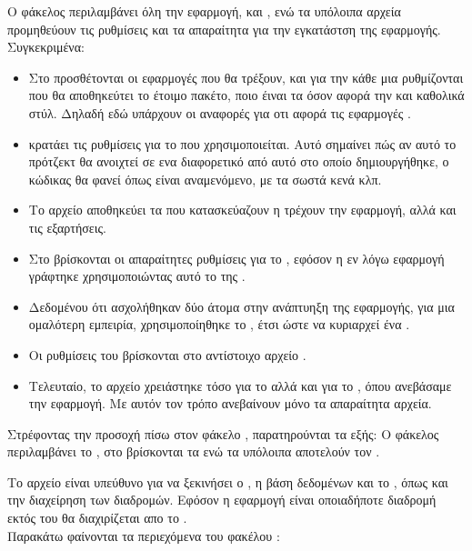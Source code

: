 \pSpace Ο φάκελος  περιλαμβάνει όλη την εφαρμογή,  και , ενώ τα υπόλοιπα αρχεία προμηθεύουν τις ρυθμίσεις και τα απαραίτητα για την εγκατάστση της εφαρμογής.\\
\pSpace Συγκεκριμένα:
\begin{itemize}
	\item Στο  προσθέτονται οι εφαρμογές που θα τρέξουν, και για την κάθε μια ρυθμίζονται που θα αποθηκεύτει το έτοιμο πακέτο, ποιο έιναι τα  όσον αφορά την  και καθολικά στύλ. Δηλαδή εδώ υπάρχουν οι αναφορές για οτι αφορά τις εφαρμογές .
	\item {} κρατάει τις ρυθμίσεις για το  που χρησιμοποιείται. Αυτό σημαίνει πώς αν αυτό το πρότζεκτ θα ανοιχτεί σε ενα διαφορετικό  από αυτό στο οποίο δημιουργήθηκε, ο κώδικας θα φανεί όπως είναι αναμενόμενο, με τα σωστά κενά κλπ.
	\item Το αρχείο  αποθηκεύει τα  που κατασκεύαζουν η τρέχουν την εφαρμογή, αλλά και τις εξαρτήσεις.
	\item Στο  βρίσκονται οι απαραίτητες ρυθμίσεις για το , εφόσον η εν λόγω εφαρμογή γράφτηκε χρησιμοποιώντας αυτό το  της .
	\item Δεδομένου ότι ασχολήθηκαν δύο άτομα στην ανάπτυηξη της εφαρμογής, για μια ομαλότερη εμπειρία, χρησιμοποίηθηκε το , έτσι ώστε να κυριαρχεί ένα . 
	\item Οι ρυθμίσεις του  βρίσκονται στο αντίστοιχο αρχείο .
	\item Τελευταίο, το αρχείο  χρειάστηκε τόσο για το  αλλά και για το , όπου ανεβάσαμε την εφαρμογή. Με αυτόν τον τρόπο ανεβαίνουν μόνο τα απαραίτητα αρχεία.
\end{itemize}
\pSpace Στρέφοντας την προσοχή πίσω στον φάκελο , παρατηρούνται τα εξής:
\pSpace Ο φάκελος  περιλαμβάνει το , στο  βρίσκονται τα  ενώ τα υπόλοιπα αποτελούν τον .

\pSpace Το αρχείο  είναι υπεύθυνο για να ξεκινήσει ο , η βάση δεδομένων και το , όπως και την διαχείρηση των διαδρομών. Εφόσον η εφαρμογή είναι  οποιαδήποτε διαδρομή εκτός του  θα διαχιρίζεται απο το .\\
\pSpace Παρακάτω φαίνονται τα περιεχόμενα του φακέλου : 

